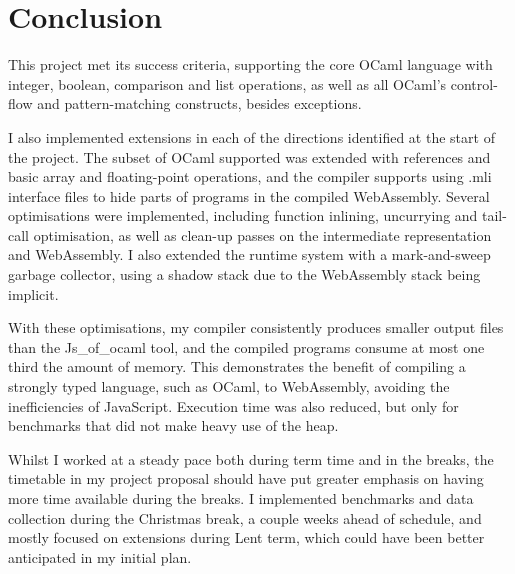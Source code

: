 \chapter{Conclusion}

This project met its success criteria, supporting the core OCaml language with integer, boolean, comparison and list operations, as well as all OCaml's control-flow and pattern-matching constructs, besides exceptions.

I also implemented extensions in each of the directions identified at the start of the project. The subset of OCaml supported was extended with references and basic array and floating-point operations, and the compiler supports using .mli interface files to hide parts of programs in the compiled WebAssembly.
Several optimisations were implemented, including function inlining, uncurrying and tail-call optimisation, as well as clean-up passes on the intermediate representation and WebAssembly.
I also extended the runtime system with a mark-and-sweep garbage collector, using a shadow stack due to the WebAssembly stack being implicit.%

With these optimisations, my compiler consistently produces smaller output files than the Js\_of\_ocaml tool, and the compiled programs consume at most one third the amount of memory. 
This demonstrates the benefit of compiling a strongly typed language, such as OCaml, to WebAssembly, avoiding the inefficiencies of JavaScript. Execution time was also reduced, but only for benchmarks that did not make heavy use of the heap.

Whilst I worked at a steady pace both during term time and in the breaks, the timetable in my project proposal should have put greater emphasis on having more time available during the breaks. I implemented benchmarks and data collection during the Christmas break, a couple weeks ahead of schedule, and mostly focused on extensions during Lent term, which could have been better anticipated in my initial plan.



